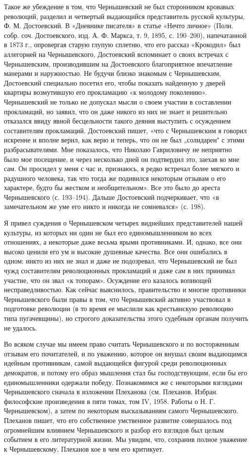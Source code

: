 Такое же убеждение в том, что Чернышевский не был сторонником кровавых
революций, разделил и четвертый выдающийся представитель русской культуры, Ф.
М. Достоевский. В «Дневнике писателя» в статье «Нечто личное» (Полн. собр. соч.
Достоевского, изд. А. Ф. Маркса, т. 9, 1895, с. 190--200), напечатанной в 1873
г., опровергая старую глупую сплетню, что его рассказ «Крокодил» был аллегорией
на Чернышевского, Достоевский вспоминает о своих встречах с Чернышевским,
производившим на Достоевского благоприятное впечатление манерами и наружностью.
Не будучи близко знакомым с Чернышевским, Достоевский специально посетил его,
чтобы показать найденную у дверей квартиры возмутившую его прокламацию «к
молодому поколению». Чернышевский не только не допускал мысли о своем участии в
составлении прокламаций, но заявил, что он даже никого из них не знает и
решительно отказался ввиду явной бесцельности такого деяния выступить с
осуждением составителям прокламаций. Достоевский пишет, «что с Чернышевским я
говорил искренне
и вполне верил, как верю и теперь, что он не был „солидарен" с этими
разбрасывателями. Мне показалось, что Николаю Гавриловичу не неприятно было мое
посещение, и через несколько дней он подтвердил это, заехав ко мне сам. Он
просидел у меня с час и, признаюсь, я редко встречал более мягкого и радушного
человека, так что тогда же подивился некоторым отзывам о его характере, будто
бы жестком и необщительном». Все это было до ареста Чернышевского (с. 193--194).
Дальше Достоевский подчеркивает, что «в замечательном же уме его никто и
никогда не сомневался» (с. 198).

Я привел суждения о Чернышевском четырех виднейших представителей нашей
культуры, из которых ни один не был его единомышленником во всех отношениях, а
некоторые даже весьма ярыми противниками. И, однако, все они высоко ценили его
ум и высокие душевные качества. Все они ошибались в одном: никто из них не знал
и даже не подозревал, что Чернышевский не был чужд составителям революционных
прокламаций и даже сам в них принимал участие, что он звал «к топорам».
Осуждение его казалось вопиющей несправедливостью. Как сейчас выяснилось,
правительство и многие противники Чернышевского были правы в том, что
Чернышевский активно участвовал в подготовке революции (в то время ее мыслили
как крестьянскую революцию типа пугачевщины), но строгого доказательства этого
судебным органам получить не удалось.

Во всяком случае мы имеем право считать Чернышевского и по восторженным отзывам
его почитателей, и по уважению, которое он внушал своим выдающимся идейным
противникам, самой выдающейся фигурой среди революционных демократов, и потому
его образ мышления стал бы господствующим, если бы его единомышленники одержали
победу. Познакомимся же с некоторыми взглядами Чернышевского сначала в
изложении Плеханова (см. Плеханов. Избран. философские произведения в пяти
томах, том IV, 1958. Работы о Н. Г. Чернышевском), а затем по некоторым
высказываниям самого Чернышевского. Плеханов пишет, что его собственное
умственное развитие совершалось под огромнейшим влиянием Чернышевского и разбор
его взглядов был целым событием в его литературной жизни. Мы увидим, что,
сохранив полное уважение к Чернышевскому, Плеханов кое в чем его критикует.

